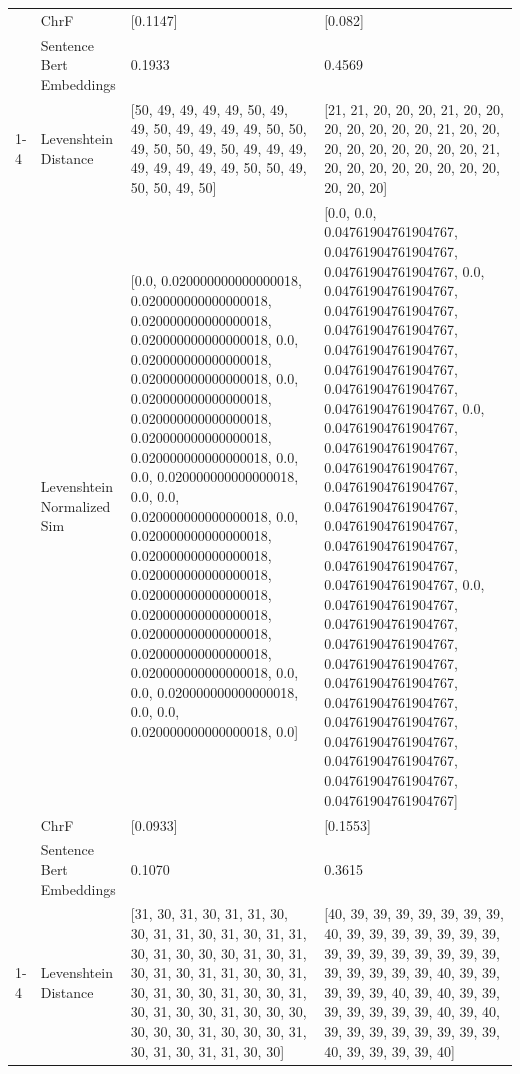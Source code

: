 \begin{tabular}{llll}
 & ChrF & [0.1147] & [0.082] \\
 & Sentence Bert Embeddings & 0.1933 & 0.4569 \\
\cline{1-4}
\multirow[t]{4}{*}{Ekyengela amangu, kivunda mangu.} & Levenshtein Distance & [50, 49, 49, 49, 49, 50, 49, 49, 50, 49, 49, 49, 49, 50, 50, 49, 50, 50, 49, 50, 49, 49, 49, 49, 49, 49, 49, 49, 50, 50, 49, 50, 50, 49, 50] & [21, 21, 20, 20, 20, 21, 20, 20, 20, 20, 20, 20, 20, 21, 20, 20, 20, 20, 20, 20, 20, 20, 20, 21, 20, 20, 20, 20, 20, 20, 20, 20, 20, 20, 20] \\
 & Levenshtein Normalized Sim & [0.0, 0.020000000000000018, 0.020000000000000018, 0.020000000000000018, 0.020000000000000018, 0.0, 0.020000000000000018, 0.020000000000000018, 0.0, 0.020000000000000018, 0.020000000000000018, 0.020000000000000018, 0.020000000000000018, 0.0, 0.0, 0.020000000000000018, 0.0, 0.0, 0.020000000000000018, 0.0, 0.020000000000000018, 0.020000000000000018, 0.020000000000000018, 0.020000000000000018, 0.020000000000000018, 0.020000000000000018, 0.020000000000000018, 0.020000000000000018, 0.0, 0.0, 0.020000000000000018, 0.0, 0.0, 0.020000000000000018, 0.0] & [0.0, 0.0, 0.04761904761904767, 0.04761904761904767, 0.04761904761904767, 0.0, 0.04761904761904767, 0.04761904761904767, 0.04761904761904767, 0.04761904761904767, 0.04761904761904767, 0.04761904761904767, 0.04761904761904767, 0.0, 0.04761904761904767, 0.04761904761904767, 0.04761904761904767, 0.04761904761904767, 0.04761904761904767, 0.04761904761904767, 0.04761904761904767, 0.04761904761904767, 0.04761904761904767, 0.0, 0.04761904761904767, 0.04761904761904767, 0.04761904761904767, 0.04761904761904767, 0.04761904761904767, 0.04761904761904767, 0.04761904761904767, 0.04761904761904767, 0.04761904761904767, 0.04761904761904767, 0.04761904761904767] \\
 & ChrF & [0.0933] & [0.1553] \\
 & Sentence Bert Embeddings & 0.1070 & 0.3615 \\
\cline{1-4}
\multirow[t]{4}{*}{Omuze gwo muntu gumalwa ntaana.} & Levenshtein Distance & [31, 30, 31, 30, 31, 31, 30, 30, 31, 31, 30, 31, 30, 31, 31, 30, 31, 30, 30, 30, 31, 30, 31, 30, 31, 30, 31, 31, 30, 30, 31, 30, 31, 30, 30, 31, 30, 30, 31, 30, 31, 30, 30, 31, 30, 30, 30, 30, 30, 30, 31, 30, 30, 30, 31, 30, 31, 30, 31, 31, 30, 30] & [40, 39, 39, 39, 39, 39, 39, 39, 40, 39, 39, 39, 39, 39, 39, 39, 39, 39, 39, 39, 39, 39, 39, 39, 39, 39, 39, 39, 39, 40, 39, 39, 39, 39, 39, 40, 39, 40, 39, 39, 39, 39, 39, 39, 39, 40, 39, 40, 39, 39, 39, 39, 39, 39, 39, 39, 40, 39, 39, 39, 39, 40] \\

\end{tabular}
